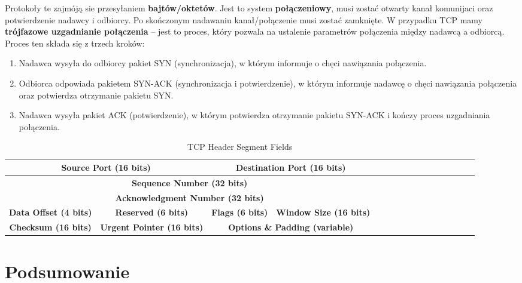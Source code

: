 \documentclass[11pt,a4paper]{article}
\begin{document}
\begin{itemize}
        Protokoły te zajmóją sie przesyłaniem \textbf{bajtów/oktetów}. Jest to system \textbf{połączeniowy}, musi zostać otwarty kanał komunijaci oraz potwierdzenie nadawcy i odbiorcy. Po skończonym nadawaniu kanał/połączenie musi zostać zamknięte. W przypadku TCP mamy \textbf{trójfazowe uzgadnianie połączenia} -- jest to proces, który pozwala na ustalenie parametrów połączenia między nadawcą a odbiorcą. Proces ten składa się z trzech kroków:
        \begin{enumerate}
            \item Nadawca wysyła do odbiorcy pakiet SYN (synchronizacja), w którym informuje o chęci nawiązania połączenia.
            \item Odbiorca odpowiada pakietem SYN-ACK (synchronizacja i potwierdzenie), w którym informuje nadawcę o chęci nawiązania połączenia oraz potwierdza otrzymanie pakietu SYN.
            \item Nadawca wysyła pakiet ACK (potwierdzenie), w którym potwierdza otrzymanie pakietu SYN-ACK i kończy proces uzgadniania połączenia.
        \end{enumerate}
\begin{table}[ht]
  \centering
  \renewcommand{\arraystretch}{1.3}
  \begin{tabular}{|c|c|c|c|c|c|c|c|c|c|c|c|c|c|c|c|}
    \hline
    \multicolumn{2}{|c|}{\textbf{Source Port (16 bits)}}
      & \multicolumn{2}{c|}{\textbf{Destination Port (16 bits)}} \\ \hline

    \multicolumn{4}{|c|}{\textbf{Sequence Number (32 bits)}} \\ \hline

    \multicolumn{4}{|c|}{\textbf{Acknowledgment Number (32 bits)}} \\ \hline

    \textbf{Data Offset (4 bits)}
      & \textbf{Reserved (6 bits)}
      & \textbf{Flags (6 bits)}
      & \textbf{Window Size (16 bits)} \\ \hline

    \textbf{Checksum (16 bits)}
      & \textbf{Urgent Pointer (16 bits)}
      & \multicolumn{2}{c|}{\textbf{Options \& Padding (variable)}} \\ \hline
  \end{tabular}
  \caption{TCP Header Segment Fields}
  \label{tab:tcp-segment}
\end{table}

\end{itemize}
\section{Podsumowanie}
\end{document}
